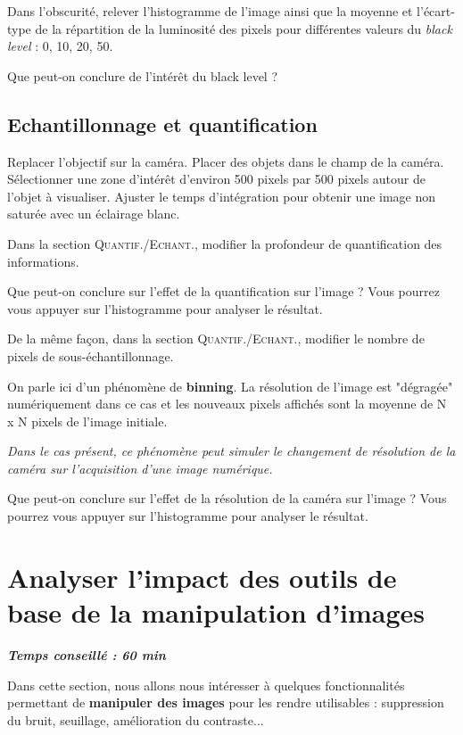 \documentclass[a4paper,11pt,titlepage]{article} %
\begin{document}
\Manip Dans l'obscurité, relever l'histogramme de l'image ainsi que la moyenne et l'écart-type de la répartition de la luminosité des pixels pour différentes valeurs du \textit{black level} : 0, 10, 20, 50.

\Quest Que peut-on conclure de l'intérêt du black level ?

\subsection{Echantillonnage et quantification}

\Manip Replacer l'objectif sur la caméra. Placer des objets dans le champ de la caméra. Sélectionner une zone d'intérêt d'environ 500 pixels par 500 pixels autour de l'objet à visualiser. Ajuster le temps d'intégration pour obtenir une image non saturée avec un éclairage blanc. 

\Manip Dans la section \textsc{Quantif./Echant.}, modifier la profondeur de quantification des informations. 

\Quest Que peut-on conclure sur l'effet de la quantification sur l'image ? Vous pourrez vous appuyer sur l'histogramme pour analyser le résultat.

\Manip De la même façon, dans la section \textsc{Quantif./Echant.}, modifier le nombre de pixels de sous-échantillonnage. 

On parle ici d'un phénomène de \textbf{binning}. La résolution de l'image est "dégragée" numériquement dans ce cas et les nouveaux pixels affichés sont la moyenne de N x N pixels de l'image initiale.

\textit{Dans le cas présent, ce phénomène peut simuler le changement de résolution de la caméra sur l'acquisition d'une image numérique.}

\Quest Que peut-on conclure sur l'effet de la résolution de la caméra sur l'image ? Vous pourrez vous appuyer sur l'histogramme pour analyser le résultat.


\newpage
\section{Analyser l'impact des outils de base de la manipulation d'images}

\begin{center} \textbf{\textit{Temps conseillé : 60 min}} \end{center}

Dans cette section, nous allons nous intéresser à quelques fonctionnalités permettant de \textbf{manipuler des images} pour les rendre utilisables : suppression du bruit, seuillage, amélioration du contraste...
\end{document}
